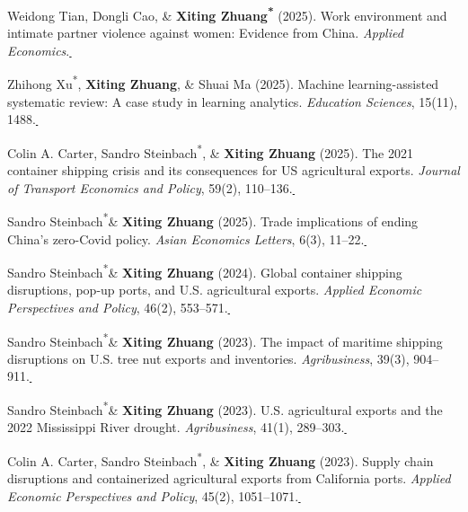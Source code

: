 \documentclass[10.8 pt,letterpaper]{article}
\newcommand{\corrauthor}{\textsuperscript{*}}
\newcommand{\paperlink}[1]{\href{#1}{\,\small\faExternalLink}}
\renewenvironment{itemize}{
	\begin{list}{}{
			\setlength{\leftmargin}{1.5em}
		}
	}{
	\end{list}
}
\begin{document}
\begin{itemize}
		\item[-] Weidong Tian, Dongli Cao, \& \textbf{Xiting Zhuang\corrauthor} (2025). Work environment and intimate partner violence against women: Evidence from China. \textit{Applied Economics}.\paperlink{https://doi.org/10.1080/00036846.2025.2590113}
		
		\item[-] Zhihong Xu\corrauthor, \textbf{Xiting Zhuang}, \& Shuai Ma (2025). Machine learning-assisted systematic review: A case study in learning analytics. \textit{Education Sciences}, 15(11), 1488.\paperlink{https://doi.org/10.3390/educsci15111488}
		
		\item[-] Colin A. Carter, Sandro Steinbach\corrauthor, \& \textbf{Xiting Zhuang} (2025). The 2021 container shipping crisis and its consequences for US agricultural exports. \textit{Journal of Transport Economics and Policy}, 59(2), 110--136.\paperlink{https://www.ingentaconnect.com/contentone/lse/jtep/2025/00000059/00000002/art00004}
		
		\item[-] Sandro Steinbach\corrauthor \& \textbf{Xiting Zhuang} (2025). Trade implications of ending China's zero-Covid policy. \textit{Asian Economics Letters}, 6(3), 11--22.\paperlink{https://doi.org/10.46557/001c.137226}
		
		\item[-] Sandro Steinbach\corrauthor \& \textbf{Xiting Zhuang} (2024). Global container shipping disruptions, pop-up ports, and U.S. agricultural exports. \textit{Applied Economic Perspectives and Policy}, 46(2), 553--571.\paperlink{https://doi.org/10.1002/aepp.13399}
		
		\item[-] Sandro Steinbach\corrauthor \& \textbf{Xiting Zhuang} (2023). The impact of maritime shipping disruptions on U.S. tree nut exports and inventories. \textit{Agribusiness}, 39(3), 904--911.\paperlink{https://doi.org/10.1002/agr.21809}
		
		\item[-] Sandro Steinbach\corrauthor \& \textbf{Xiting Zhuang} (2023). U.S. agricultural exports and the 2022 Mississippi River drought. \textit{Agribusiness}, 41(1), 289--303.\paperlink{https://doi.org/10.1002/agr.21880}
		
		\item[-] Colin A. Carter, Sandro Steinbach\corrauthor, \& \textbf{Xiting Zhuang} (2023). Supply chain disruptions and containerized agricultural exports from California ports. \textit{Applied Economic Perspectives and Policy}, 45(2), 1051--1071.\paperlink{https://doi.org/10.1002/aepp.13311}
		

\end{itemize}
\end{document}
